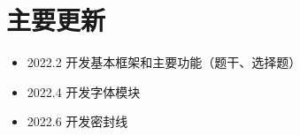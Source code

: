 
\section{主要更新}

\begin{itemize}
  \item 2022.2 开发基本框架和主要功能（题干、选择题）
  \item 2022.4 开发字体模块
  \item 2022.6 开发密封线
\end{itemize}